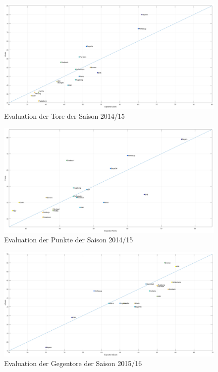 \begin{figure}
\centering
\includegraphics[scale=0.3]{se-wa-jpg/goals_correlation_14_15}
\caption{Evaluation der Tore der Saison 2014/15}
\label{lines}
\end{figure}

\begin{figure}
\centering
\includegraphics[scale=0.3]{se-wa-jpg/points_correlation_14_15}
\caption{Evaluation der Punkte der Saison 2014/15}
\label{lines}
\end{figure}

\begin{figure}
\centering
\includegraphics[scale=0.3]{se-wa-jpg/cGoals_correlation_15_16}
\caption{Evaluation der Gegentore der Saison 2015/16}
\label{lines}
\end{figure}

